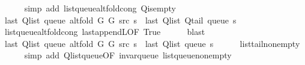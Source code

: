 \begin{isabellebody}
\ \ \ \ \isamarkupfalse%
\ {\isacharparenleft}{\kern0pt}simp\ add{\isacharcolon}{\kern0pt}\ list{\isacharunderscore}{\kern0pt}queue{\isacharunderscore}{\kern0pt}alt{\isacharunderscore}{\kern0pt}fold{\isacharunderscore}{\kern0pt}cong\ Q{\isachardot}{\kern0pt}is{\isacharunderscore}{\kern0pt}empty{\isacharparenright}{\kern0pt}\isanewline
\isanewline
\ \ \isamarkupfalse%
\ {\isachardoublequoteopen}last\ {\isacharparenleft}{\kern0pt}Q{\isacharunderscore}{\kern0pt}list\ {\isacharparenleft}{\kern0pt}queue\ {\isacharparenleft}{\kern0pt}alt{\isacharunderscore}{\kern0pt}fold\ G{}\ G{}\ src\ s{\isacharparenright}{\kern0pt}{\isacharparenright}{\kern0pt}{\isacharparenright}{\kern0pt}\ {\isacharequal}{\kern0pt}\ last\ {\isacharparenleft}{\kern0pt}Q{\isacharunderscore}{\kern0pt}list\ {\isacharparenleft}{\kern0pt}Q{\isacharunderscore}{\kern0pt}tail\ {\isacharparenleft}{\kern0pt}queue\ s{\isacharparenright}{\kern0pt}{\isacharparenright}{\kern0pt}{\isacharparenright}{\kern0pt}{\isachardoublequoteclose}\isanewline
\ \ \ \ \isamarkupfalse%
\ list{\isacharunderscore}{\kern0pt}queue{\isacharunderscore}{\kern0pt}alt{\isacharunderscore}{\kern0pt}fold{\isacharunderscore}{\kern0pt}cong\ last{\isacharunderscore}{\kern0pt}appendL{\isacharbrackleft}{\kern0pt}OF\ True{\isacharbrackright}{\kern0pt}\isanewline
\ \ \ \ \isamarkupfalse%
\ blast\isanewline
\ \ \isamarkupfalse%
\ {\isachardoublequoteopen}last\ {\isacharparenleft}{\kern0pt}Q{\isacharunderscore}{\kern0pt}list\ {\isacharparenleft}{\kern0pt}queue\ {\isacharparenleft}{\kern0pt}alt{\isacharunderscore}{\kern0pt}fold\ G{}\ G{}\ src\ s{\isacharparenright}{\kern0pt}{\isacharparenright}{\kern0pt}{\isacharparenright}{\kern0pt}\ {\isacharequal}{\kern0pt}\ last\ {\isacharparenleft}{\kern0pt}Q{\isacharunderscore}{\kern0pt}list\ {\isacharparenleft}{\kern0pt}queue\ s{\isacharparenright}{\kern0pt}{\isacharparenright}{\kern0pt}{\isachardoublequoteclose}\isanewline
\ \ \ \ \isamarkupfalse%
\ list{\isacharunderscore}{\kern0pt}tail{\isacharunderscore}{\kern0pt}non{\isacharunderscore}{\kern0pt}empty\isanewline
\ \ \ \ \isamarkupfalse%
\ {\isacharparenleft}{\kern0pt}simp\ add{\isacharcolon}{\kern0pt}\ Q{\isachardot}{\kern0pt}list{\isacharunderscore}{\kern0pt}queue{\isacharbrackleft}{\kern0pt}OF\ invar{\isacharunderscore}{\kern0pt}queue\ list{\isacharunderscore}{\kern0pt}queue{\isacharunderscore}{\kern0pt}non{\isacharunderscore}{\kern0pt}empty{\isacharbrackright}{\kern0pt}{\isacharparenright}{\kern0pt}\isanewline

\end{isabellebody}
